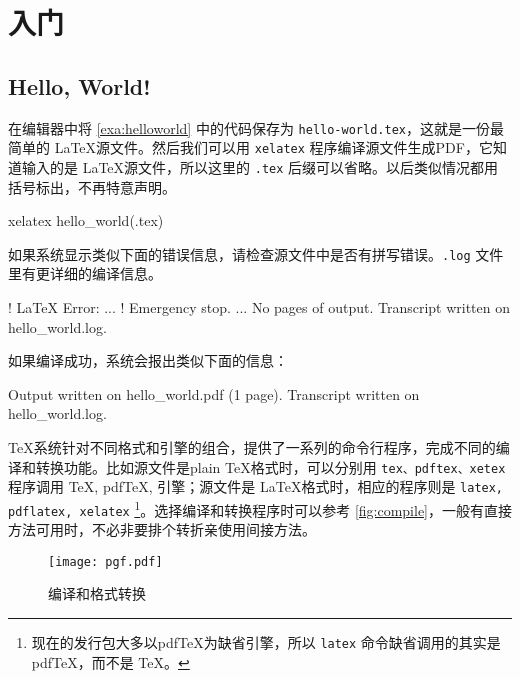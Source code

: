\chapter{入门}

\section{Hello, World!}
\begin{example}[h]
\caption{Hello, World!}
\label{exa:helloworld}
\end{example}

在编辑器中将 \autoref{exa:helloworld} 中的代码保存为 \verb|hello-world.tex|，这就是一份最简单的 \LaTeX 源文件。然后我们可以用 \texttt{xelatex} 程序编译源文件生成PDF，它知道输入的是 \LaTeX 源文件，所以这里的 \texttt{.tex} 后缀可以省略。以后类似情况都用括号标出，不再特意声明。

\begin{Code}[]
xelatex hello_world(.tex)
\end{Code}

如果系统显示类似下面的错误信息，请检查源文件中是否有拼写错误。\texttt{.log} 文件里有更详细的编译信息。

\begin{Code}[numbers=left]
! LaTeX Error:
...
! Emergency stop.
...
No pages of output.
Transcript written on hello_world.log.
\end{Code}

如果编译成功，系统会报出类似下面的信息：

\begin{Code}[]
Output written on hello_world.pdf (1 page).
Transcript written on hello_world.log.
\end{Code}

\TeX 系统针对不同格式和引擎的组合，提供了一系列的命令行程序，完成不同的编译和转换功能。比如源文件是plain \TeX 格式时，可以分别用 \texttt{tex、pdftex、xetex} 程序调用 \TeX, pdfTeX, \XeTeX 引擎；源文件是 \LaTeX 格式时，相应的程序则是 \texttt{latex, pdflatex, xelatex} \footnote{现在的发行包大多以pdfTeX为缺省引擎，所以 \texttt{latex} 命令缺省调用的其实是pdfTeX，而不是 \TeX 。}。选择编译和转换程序时可以参考 \autoref{fig:compile}，一般有直接方法可用时，不必非要排个转折亲使用间接方法。

\begin{figure}[htbp]
\centering
\texttt{[image: pgf.pdf]}
\caption{编译和格式转换}
\label{fig:compile}
\end{figure}

